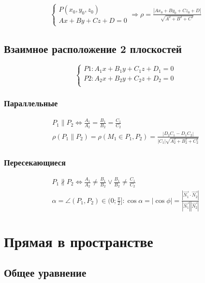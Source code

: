 \documentclass{article}
\begin{document}
\begin{gather*}
	\begin{cases}
		P(x_0, y_0, z_0) \\
		Ax + By + Cz + D = 0
	\end{cases} \Rightarrow
	\rho = \frac{|Ax_0 + By_0 + Cz_0 + D|}{\sqrt{A^2 + B^2 + C^2}}
\end{gather*}

\subsection{Взаимное расположение 2 плоскостей}

\[
\begin{cases}
	P1 : A_1x + B_1y + C_1z + D_1 = 0 \\
	P2 : A_2x + B_2y + C_2z + D_2 = 0 \\
\end{cases}
\]

\subsubsection{Параллельные}

\begin{gather*}
	P_1 \parallel P_2 \Leftrightarrow \frac{A_1}{A_2} =
	\frac{B_1}{B_2} = \frac{C_1}{C_2} \\
	\rho(P_1 \parallel P_2) = \rho(M_1 \in P_1, P_2) =
	\frac{|D_2 C_1 - D_1 C_2|}{|C_1| \sqrt{A_2^2 + B_2^2 + C_2^2}}
\end{gather*}

\subsubsection{Пересекающиеся}

\begin{gather*}
	P_1 \not \parallel P_2 \Leftrightarrow
	\frac{A_1}{A_2} \ne \frac{B_1}{B_2} \lor \frac{B_1}{B_2} \ne \frac{C_1}{C_2} \\
	\alpha = \angle(P_1, P_2) \in (0; \frac{\pi}{2}] :
	\cos \alpha = |\cos \phi| = \frac{|\vec{N_1} \cdot \vec{N_2}|}{|\vec{N_1}| |\vec{N_2}|}
\end{gather*}

\section{Прямая в пространстве}

\subsection{Общее уравнение}
\end{document}
